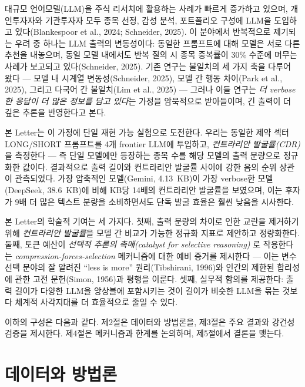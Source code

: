 \documentclass[11pt,letterpaper]{article}
\begin{document}
대규모 언어모델(LLM)을 주식 리서치에 활용하는 사례가 빠르게 증가하고 있으며, 개인투자자와 기관투자자 모두 종목 선정, 감성 분석, 포트폴리오 구성에 LLM을 도입하고 있다(Blankespoor et al., 2024; Schneider, 2025). 이 분야에서 반복적으로 제기되는 우려 중 하나는 LLM 출력의 변동성이다: 동일한 프롬프트에 대해 모델은 서로 다른 추천을 내놓으며, 동일 모델 내에서도 반복 질의 시 종목 중복률이 30\% 수준에 머무는 사례가 보고되고 있다(Schneider, 2025). 기존 연구는 불일치의 세 가지 축을 다루어 왔다 --- 모델 내 시계열 변동성(Schneider, 2025), 모델 간 행동 차이(Park et al., 2025), 그리고 다국어 간 불일치(Lim et al., 2025) --- 그러나 이들 연구는 \textit{더 verbose한 응답이 더 많은 정보를 담고 있다}는 가정을 암묵적으로 받아들이며, 긴 출력이 더 깊은 추론을 반영한다고 본다.

본 Letter는 이 가정에 단일 재현 가능 실험으로 도전한다. 우리는 동일한 제약 섹터 LONG/SHORT 프롬프트를 4개 frontier LLM에 투입하고, \textit{컨트라리안 발굴률(CDR)}을 측정한다 --- 즉 단일 모델에만 등장하는 종목 수를 해당 모델의 출력 분량으로 정규화한 값이다. 결과적으로 출력 길이와 컨트라리안 발굴률 사이에 강한 음의 순위 상관이 관측되었다. 가장 압축적인 모델(Gemini, 4.13~KB)이 가장 verbose한 모델(DeepSeek, 38.6~KB)에 비해 KB당 14배의 컨트라리안 발굴률을 보였으며, 이는 후자가 9배 더 많은 텍스트 분량을 소비하면서도 단독 발굴 효율은 훨씬 낮음을 시사한다.

본 Letter의 학술적 기여는 세 가지다. 첫째, 출력 분량의 차이로 인한 교란을 제거하기 위해 \textit{컨트라리안 발굴률}을 모델 간 비교가 가능한 정규화 지표로 제안하고 정량화한다. 둘째, 토큰 예산이 \textit{선택적 추론의 촉매(catalyst for selective reasoning)} 로 작용한다는 \textit{compression-forces-selection} 메커니즘에 대한 예비 증거를 제시한다 --- 이는 변수 선택 분야의 잘 알려진 ``less is more'' 원리(Tibshirani, 1996)와 인간의 제한된 합리성에 관한 고전 문헌(Simon, 1956)과 평행을 이룬다. 셋째, 실무적 함의를 제공한다: 출력 길이가 다양한 LLM을 앙상블에 포함시키는 것이 길이가 비슷한 LLM을 묶는 것보다 체계적 사각지대를 더 효율적으로 줄일 수 있다.

이하의 구성은 다음과 같다. 제2절은 데이터와 방법론을, 제3절은 주요 결과와 강건성 검증을 제시한다. 제4절은 메커니즘과 한계를 논의하며, 제5절에서 결론을 맺는다.

\section{데이터와 방법론}\label{sec:data}
\end{document}

